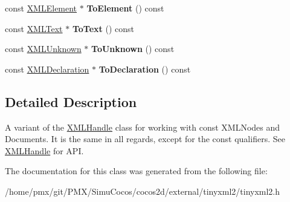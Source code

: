 \begin{DoxyCompactItemize}
\item 
\mbox{\label{classtinyxml2_1_1XMLConstHandle_a4dba53c6e201d412e915620feaaa56f3}} 
const \hyperlink{classtinyxml2_1_1XMLElement}{X\+M\+L\+Element} $\ast$ {\bfseries To\+Element} () const
\item 
\mbox{\label{classtinyxml2_1_1XMLConstHandle_a80e24d90d476005aa35602a665358e2d}} 
const \hyperlink{classtinyxml2_1_1XMLText}{X\+M\+L\+Text} $\ast$ {\bfseries To\+Text} () const
\item 
\mbox{\label{classtinyxml2_1_1XMLConstHandle_a4395e5feaba7b456a81ca274880ea3d3}} 
const \hyperlink{classtinyxml2_1_1XMLUnknown}{X\+M\+L\+Unknown} $\ast$ {\bfseries To\+Unknown} () const
\item 
\mbox{\label{classtinyxml2_1_1XMLConstHandle_a55e306d105fa80d626041e4d3b77b716}} 
const \hyperlink{classtinyxml2_1_1XMLDeclaration}{X\+M\+L\+Declaration} $\ast$ {\bfseries To\+Declaration} () const
\end{DoxyCompactItemize}


\subsection{Detailed Description}
A variant of the \hyperlink{classtinyxml2_1_1XMLHandle}{X\+M\+L\+Handle} class for working with const X\+M\+L\+Nodes and Documents. It is the same in all regards, except for the \textquotesingle{}const\textquotesingle{} qualifiers. See \hyperlink{classtinyxml2_1_1XMLHandle}{X\+M\+L\+Handle} for A\+PI. 

The documentation for this class was generated from the following file\+:\begin{DoxyCompactItemize}
\item 
/home/pmx/git/\+P\+M\+X/\+Simu\+Cocos/cocos2d/external/tinyxml2/tinyxml2.\+h\end{DoxyCompactItemize}
